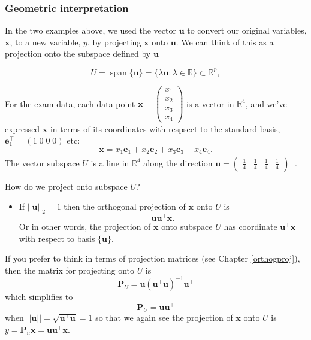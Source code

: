 \documentclass[]{book}
\providecommand{\tightlist}{%
  \setlength{\itemsep}{0pt}\setlength{\parskip}{0pt}}
\theoremstyle{definition}
\theoremstyle{definition}
\theoremstyle{definition}
\theoremstyle{remark}
\begin{document}
\hypertarget{geometric-interpretation}{%
\subsubsection*{Geometric interpretation}\label{geometric-interpretation}}

In the two examples above, we used the vector \(\boldsymbol u\) to convert our original variables, \(\boldsymbol x\),
to a new variable, \(y\), by projecting \(\boldsymbol x\) onto \(\boldsymbol u\).
We can think of this as a projection onto the subspace defined by \(\boldsymbol u\)

\[U = \operatorname{span}\{\boldsymbol u\} = \{\lambda \boldsymbol u: \lambda \in \mathbb{R}\}\subset \mathbb{R}^p,\]

For the exam data, each data point \(\boldsymbol x= \begin{pmatrix} x_1 \\ x_2 \\ x_3 \\ x_4 \end{pmatrix}\)
is a vector in \(\mathbb{R}^4\), and we've expressed \(\boldsymbol x\) in terms of its coordinates with respsect to the standard basis, \(\boldsymbol e_1^\top = (1\; 0\; 0 \; 0)\) etc:
\[\boldsymbol x=x_1 \boldsymbol e_1 + x_2 \boldsymbol e_2 +x_3 \boldsymbol e_3 +x_4 \boldsymbol e_4.\]
The vector subspace \(U\) is a line in \(\mathbb{R}^4\) along the direction \(\boldsymbol u= \begin{pmatrix} \frac{1}{4} & \frac{1}{4} & \frac{1}{4} & \frac{1}{4} \end{pmatrix}^\top\).

How do we project onto subspace \(U\)?

\begin{itemize}
\tightlist
\item
  If \(||\boldsymbol u||_2=1\) then the orthogonal projection of \(\boldsymbol x\) onto \(U\) is\\
  \[\boldsymbol u\boldsymbol u^\top\boldsymbol x.\]
  Or in other words, the projection of \(\boldsymbol x\) onto subspace \(U\) has coordinate \(\boldsymbol u^\top \boldsymbol x\) with respect to basis \(\{\boldsymbol u\}\).
\end{itemize}

If you prefer to think in terms of projection matrices (see Chapter \ref{orthogproj}), then the matrix for projecting onto \(U\) is
\[\boldsymbol P_U = \boldsymbol u(\boldsymbol u^\top \boldsymbol u)^{-1}\boldsymbol u^\top\]
which simplifies to
\[\boldsymbol P_U = \boldsymbol u\boldsymbol u^\top\]
when \(||\boldsymbol u||=\sqrt{\boldsymbol u^\top\boldsymbol u}=1\) so that we again see the projection of \(\boldsymbol x\) onto \(U\) is \(y=\boldsymbol P_u \boldsymbol x= \boldsymbol u\boldsymbol u^\top\boldsymbol x\).
\end{document}
